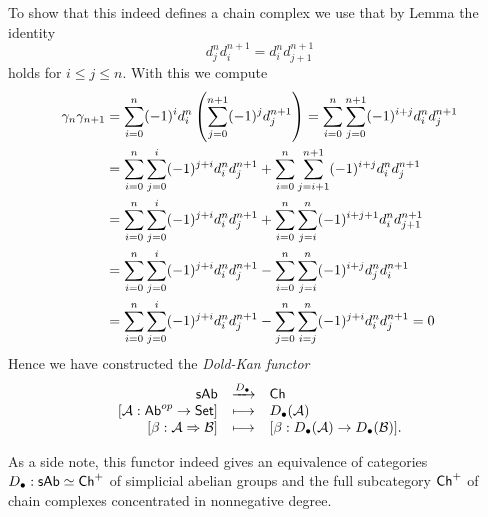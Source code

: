 	To show that this indeed defines a chain complex we use that by Lemma  the identity
	\begin{equation*}
		d_j^nd_i^{n+1} = d_i^nd_{j+1}^{n+1}
	\end{equation*}
	holds for $i \leq j \leq n$. With this we compute
	\begin{align*}
		\gamma_n\gamma_{n+1} &= \sum \limits_{i=0}^n(-1)^i d_i^n \left(\sum \limits_{j=0}^{n+1}(-1)^j d_j^{n+1}\right)
		= \sum \limits_{i=0}^n \sum \limits_{j=0}^{n+1}(-1)^{i+j}d_i^nd_j^{n+1}\\
		&=\sum\limits_{i=0}^n\sum\limits_{j=0}^{i}(-1)^{j+i}d_i^nd_j^{n+1} + \sum\limits_{i=0}^n\sum\limits_{j=i+1}^{n+1}(-1)^{i+j}d_i^nd_j^{n+1}\\
		&=\sum\limits_{i=0}^n\sum\limits_{j=0}^{i}(-1)^{j+i}d_i^nd_j^{n+1} + \sum\limits_{i=0}^n\sum\limits_{j=i}^{n}(-1)^{i+j+1}d_i^nd_{j+1}^{n+1}\\
		&=\sum\limits_{i=0}^n\sum\limits_{j=0}^{i}(-1)^{j+i}d_i^nd_j^{n+1} - \sum\limits_{i=0}^n\sum\limits_{j=i}^{n}(-1)^{i+j}d_j^nd_i^{n+1}\\
		&=\sum\limits_{i=0}^n\sum\limits_{j=0}^{i}(-1)^{j+i}d_i^nd_j^{n+1} - \sum\limits_{j=0}^n\sum\limits_{i=j}^{n}(-1)^{j+i}d_i^nd_j^{n+1} = 0
	\end{align*}
	Hence we have constructed the \textit{Dold-Kan functor}
	\begin{equation*}
		\begin{array}{rcl}
			\textsf{sAb} & \xrightarrow{D_\bullet} & \textsf{Ch}\\
			{[\mathcal{A}:\textsf{Ab}^{op}\rightarrow\textsf{Set}]} & \longmapsto & {D_\bullet(\mathcal{A})}\\
			{[\beta:\mathcal{A}\Rightarrow \mathcal{B}]} & \longmapsto& {[\beta:D_\bullet(\mathcal{A})\rightarrow D_\bullet(\mathcal{B})].}
		\end{array}
	\end{equation*}

	As a side note, this functor indeed gives an equivalence of categories $D_\bullet: \textsf{sAb} \simeq \textsf{Ch}^{+}$ of simplicial abelian groups and the full subcategory $\textsf{Ch}^{+}$ of chain complexes concentrated in nonnegative degree. 

